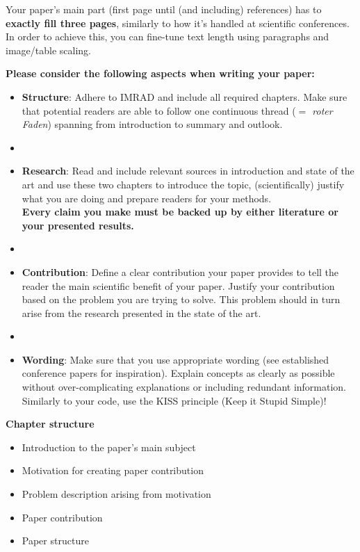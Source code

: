 \documentclass[conference]{IEEEtran}
\begin{document}
\vspace{\baselineskip}
\color{structure}Your paper's main part (first page until (and including) references) has to \textbf{exactly fill three pages}, similarly to how it's handled at scientific conferences. In order to achieve this, you can fine-tune text length using paragraphs and image/table scaling.\color{black}

\vspace{\baselineskip}
\textbf{Please consider the following aspects when writing your paper:}
\begin{itemize}
    \item \textbf{Structure}: Adhere to IMRAD and include all required chapters. Make sure that potential readers are able to follow one continuous thread (\textit{$=$ roter Faden}) spanning from introduction to summary and outlook.
    
    \item[]
    \item \textbf{Research}: Read and include relevant sources in introduction and state of the art and use these two chapters to introduce the topic, (scientifically) justify what you are doing and prepare readers for your methods.\\
    \textbf{Every claim you make must be backed up by either literature or your presented results.}
    
    \item[]
    \item \textbf{Contribution}: Define a clear contribution your paper provides to tell the reader the main scientific benefit of your paper. Justify your contribution based on the problem you are trying to solve. This problem should in turn arise from the research presented in the state of the art.
    
    \item[]
    \item \textbf{Wording}: Make sure that you use appropriate wording (see established conference papers for inspiration). Explain concepts as clearly as possible without over-complicating explanations or including redundant information. Similarly to your code, use the KISS principle (Keep it Stupid Simple)!
\end{itemize}

\vspace{\baselineskip}
\color{structure}
\textbf{Chapter structure}
\begin{itemize}
    \item Introduction to the paper's main subject
    \item Motivation for creating paper contribution
    \item Problem description arising from motivation
    \item Paper contribution
    \item Paper structure
\end{itemize}
\color{black}
\end{document}
